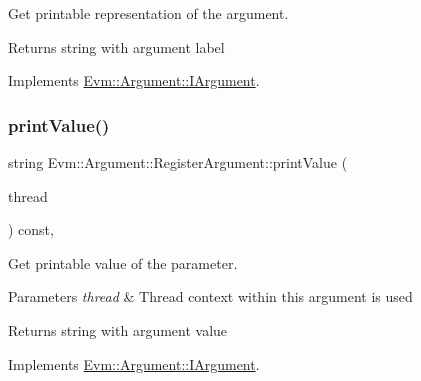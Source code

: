 Get printable representation of the argument. 

\begin{DoxyReturn}{Returns}
string with argument label 
\end{DoxyReturn}


Implements \mbox{\hyperlink{struct_evm_1_1_argument_1_1_i_argument_a35bdae816e89f6f9fc393b6e03c5e521}{Evm\+::\+Argument\+::\+I\+Argument}}.

\mbox{\label{struct_evm_1_1_argument_1_1_register_argument_a68e1690a92a7e7844fd89cc9b2dd3a6c}} 
\subsubsection{\texorpdfstring{print\+Value()}{printValue()}}
{\footnotesize\ttfamily string Evm\+::\+Argument\+::\+Register\+Argument\+::print\+Value (\begin{DoxyParamCaption}\item[{\mbox{\hyperlink{struct_evm_1_1_thread_context}{Thread\+Context}} \&}]{thread }\end{DoxyParamCaption}) const\hspace{0.3cm}{\ttfamily [override]}, {\ttfamily [virtual]}}



Get printable value of the parameter. 


\begin{DoxyParams}{Parameters}
{\em thread} & Thread context within this argument is used \\
\hline
\end{DoxyParams}
\begin{DoxyReturn}{Returns}
string with argument value 
\end{DoxyReturn}


Implements \mbox{\hyperlink{struct_evm_1_1_argument_1_1_i_argument_afcab2d2a1515518a111881a635c83da3}{Evm\+::\+Argument\+::\+I\+Argument}}.

\mbox{\label{struct_evm_1_1_argument_1_1_register_argument_afc97b81c554d6f77c9736178c54816cc}} 
